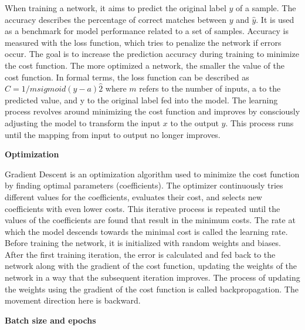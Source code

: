 When training a network, it aims to predict the original label $y$ of a sample. The accuracy describes the percentage of correct matches between $y$ and $\hat{y}$. It is used as a benchmark for model performance related to a set of samples. Accuracy is measured with the loss function, which tries to penalize the network if errors occur. The goal is to increase the prediction accuracy during training to minimize the cost function. The more optimized a network, the smaller the value of the cost function. 
In formal terms, the loss function can be described as 
${C = 1/m sigmoid (y-a)\hat{2}}$ where $m$ refers to the number of inputs, a to the predicted value, and y to the original label fed into the model.
The learning process revolves around minimizing the cost function and improves by consciously adjusting the model to transform the input $x$ to the output $y$. This process runs until the mapping from input to output no longer improves. 

\textbf{Optimization}

Gradient Descent is an optimization algorithm used to minimize the cost function by finding optimal parameters (coefficients). 
The optimizer continuously tries different values for the coefficients, evaluates their cost, and selects new coefficients with even lower costs. This iterative process is repeated until the values of the coefficients are found that result in the minimum costs. The rate at which the model descends towards the minimal cost is called the learning rate. Before training the network, it is initialized with random weights and biases. After the first training iteration, the error is calculated and fed back to the network along with the gradient of the cost function, updating the weights of the network in a way that the subsequent iteration improves. The process of updating the weights using the gradient of the cost function is called backpropagation. The movement direction here is backward.  

\textbf{Batch size and epochs}

